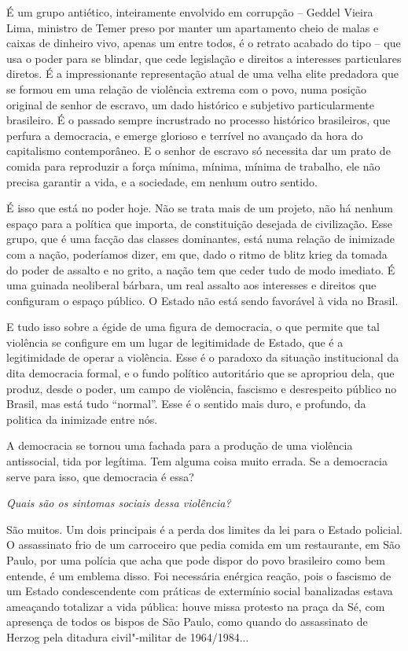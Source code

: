 É um grupo antiético, inteiramente envolvido em corrupção -- Geddel
Vieira Lima, ministro de Temer preso por manter um apartamento cheio
de malas e caixas de dinheiro vivo, apenas um entre todos, é o retrato
acabado do tipo -- que usa o poder para se blindar, que cede legislação
e direitos a interesses particulares diretos. É a impressionante
representação atual de uma velha elite predadora que se formou em uma
relação de violência extrema com o povo, numa posição original de senhor
de escravo, um dado histórico e subjetivo particularmente brasileiro. É
o passado sempre incrustrado no processo histórico brasileiros, que
perfura a democracia, e emerge glorioso e terrível no avançado da hora
do capitalismo contemporâneo. E o senhor de escravo só necessita dar um
prato de comida para reproduzir a força mínima, mínima, mínima de
trabalho, ele não precisa garantir a vida, e a sociedade, em nenhum
outro sentido.

É isso que está no poder hoje. Não se trata mais de um projeto, não há
nenhum espaço para a política que importa, de constituição desejada de
civilização. Esse grupo, que é uma facção das classes dominantes, está
numa relação de inimizade com a nação, poderíamos dizer, em que, dado o
ritmo de blitz krieg da tomada do poder de assalto e no grito, a nação
tem que ceder tudo de modo imediato. É uma guinada neoliberal bárbara,
um real assalto aos interesses e direitos que configuram o espaço
público. O Estado não está sendo favorável à vida no Brasil.

E tudo isso sobre a égide de uma figura de democracia, o que permite que
tal violência se configure em um lugar de legitimidade de Estado, que é
a legitimidade de operar a violência. Esse é o paradoxo da situação
institucional da dita democracia formal, e o fundo político autoritário
que se apropriou dela, que produz, desde o poder, um campo de violência,
fascismo e desrespeito público no Brasil, mas está tudo ``normal''. Esse
é o sentido mais duro, e profundo, da politica da inimizade entre nós.

A democracia se tornou uma fachada para a produção de uma violência
antissocial, tida por legítima. Tem alguma coisa muito errada. Se a
democracia serve para isso, que democracia é essa?

\medskip

\noindent\emph{Quais são os sintomas sociais dessa violência?}

\noindent São muitos. Um dois principais é a perda dos limites da lei para o
Estado policial. O assassinato frio de um carroceiro que pedia comida em
um restaurante, em São Paulo, por uma polícia que acha que pode dispor
do povo brasileiro como bem entende, é um emblema disso. Foi necessária
enérgica reação, pois o fascismo de um Estado condescendente com
práticas de extermínio social banalizadas estava ameaçando totalizar a
vida pública: houve missa protesto na praça da Sé, com apresença de
todos os bispos de São Paulo, como quando do assassinato de Herzog pela
ditadura civil"-militar de 1964/1984...

